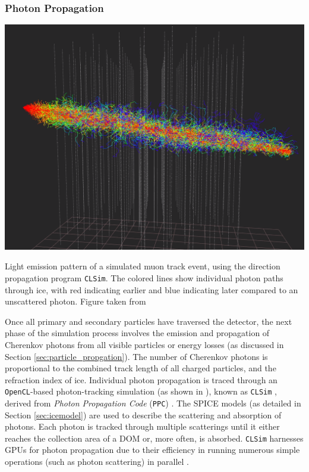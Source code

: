 \subsubsection*{Photon Propagation}
\begin{marginfigure}
    \includegraphics{./figures/EventSample/Icecube_muon_photons.png}
    \caption[Light emission pattern of a simulated muon track event]{Light emission pattern of a simulated muon track event, using the direction propagation program \texttt{CLSim}. The colored lines show individual photon paths through ice, with red indicating earlier and blue indicating later compared to an unscattered photon. Figure taken from \cite{IC_photon_picture}}
    
\end{marginfigure}
Once all primary and secondary particles have traversed the detector, the next phase of the simulation process involves the emission and propagation of Cherenkov photons from all visible particles or energy losses (as discussed in Section \ref{sec:particle_propgation}). The number of Cherenkov photons is proportional to the combined track length of all charged particles, and the refraction index of ice. Individual photon propagation is traced through an \texttt{OpenCL}-based photon-tracking simulation (as shown in ), known as \texttt{CLSim} , derived from \emph{Photon Propagation Code} (\texttt{PPC}) . The SPICE models (as detailed in Section \ref{sec:icemodel})  are used to describe the scattering and absorption of photons. Each photon is tracked through multiple scatterings until it either reaches the collection area of a DOM or, more often, is absorbed. \texttt{CLSim} harnesses GPUs for photon propagation due to their efficiency in running numerous simple operations (such as photon scattering) in parallel \cite{PPC_dima}. 

